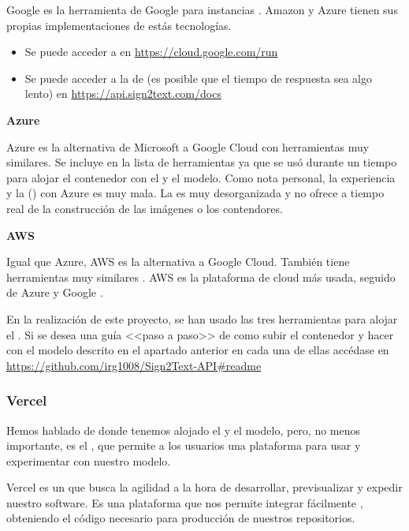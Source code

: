 Google  es la herramienta de Google para instancias . Amazon y Azure tienen sus propias implementaciones de estás tecnologías.

\begin{itemize}
  \item Se puede acceder a  en \url{https://cloud.google.com/run}
  \item Se puede acceder a la  de  (es posible que el tiempo de respuesta sea algo lento) en \url{https://api.sign2text.com/docs}
\end{itemize}

\textbf{Azure}

Azure es la alternativa de Microsoft a Google Cloud con herramientas muy similares. Se incluye en la lista de herramientas ya que se usó durante un tiempo para alojar el contenedor con el  y el modelo. Como nota personal, la experiencia y la  () con Azure es muy mala. La  es muy desorganizada y no ofrece  a tiempo real de la construcción de las imágenes o los contendores.

\textbf{AWS}

Igual que Azure, AWS es la alternativa a Google Cloud. También tiene herramientas muy similares . AWS es la plataforma de cloud más usada, seguido de Azure y Google .

En la realización de este proyecto, se han usado las tres herramientas para alojar el . Si se desea una guía <<paso a paso>> de como subir el contenedor y hacer  con el modelo descrito en el apartado anterior en cada una de ellas accédase en \url{https://github.com/irg1008/Sign2Text-API#readme}

\subsubsection{Vercel}

Hemos hablado de donde tenemos alojado el  y el modelo, pero, no menos importante, es el , que permite a los usuarios una plataforma para usar y experimentar con nuestro modelo.

Vercel es un  que busca la agilidad a la hora de desarrollar, previsualizar y expedir nuestro software. Es una plataforma que nos permite integrar fácilmente , obteniendo el código necesario para producción de nuestros repositorios.

